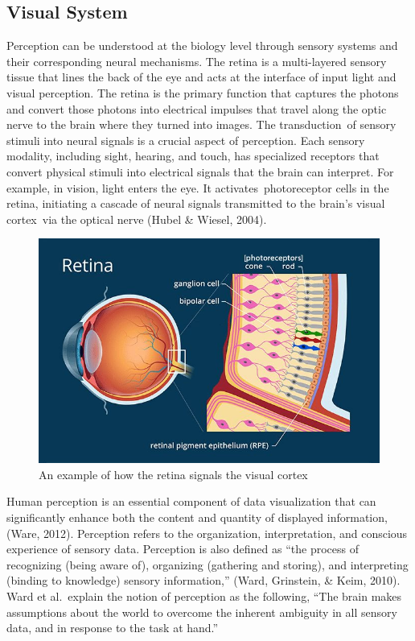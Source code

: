 \documentclass[print]{nuthesis}
\begin{document}
\hypertarget{visual-system}{%
\subsection{Visual System}\label{visual-system}}

Perception can be understood at the biology level through sensory systems and their corresponding neural mechanisms.
The retina is a multi-layered sensory tissue that lines the back of the eye and acts at the interface of input light and visual perception.
The retina is the primary function that captures the photons and convert those photons into electrical impulses that travel along the optic nerve to the brain where they turned into images.
The transduction~of sensory stimuli into neural signals is a crucial aspect of perception.
Each sensory modality, including sight, hearing, and touch, has specialized receptors that convert physical stimuli into electrical signals that the brain can interpret.
For example, in vision, light enters the eye.
It activates~photoreceptor cells in the retina, initiating a cascade of neural signals transmitted to the brain's visual cortex~via the optical nerve (Hubel \& Wiesel, 2004).

\begin{figure}

{\centering \includegraphics[width=0.55\linewidth]{figure/photoreceptors_image} 

}

\caption{An example of how the retina signals the visual cortex}\label{fig:photoreceptor}
\end{figure}

Human perception is an essential component of data visualization that can significantly enhance both the content and quantity of displayed information, (Ware, 2012).
Perception refers to the organization, interpretation, and conscious experience of sensory data.
Perception is also defined as ``the process of recognizing (being aware of), organizing (gathering and storing), and interpreting (binding to knowledge) sensory information,'' (Ward, Grinstein, \& Keim, 2010).
Ward et al.~explain the notion of perception as the following, ``The brain makes assumptions about the world to overcome the inherent ambiguity in all sensory data, and in response to the task at hand.''
\end{document}
